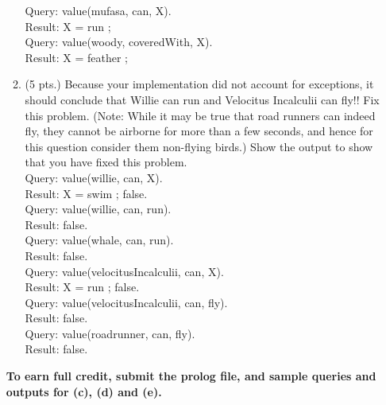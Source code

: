 \documentclass{article}%
\begin{document}
\begin{enumerate}
\begin{enumerate}
		Query: value(mufasa, can, X).\\
		Result: X = run ;\\
		
		Query: value(woody, coveredWith, X).\\
		Result: X = feather ;\\
		
		
		
		\item (5 pts.) Because your implementation did not account for exceptions, it should conclude that Willie can run and Velocitus Incalculii can fly!! Fix this problem. (Note: While it may be true that road runners can indeed fly, they cannot be airborne for more than a few seconds, and hence for this question consider them non-flying birds.) Show the output to show that you have fixed this problem. \\
		
		Query: value(willie, can, X). \\
		Result: X = swim ; false. \\
		
		Query: value(willie, can, run). \\
		Result: false. \\
		 
		Query: value(whale, can, run). \\
		Result: false. \\
		
		Query: value(velocitusIncalculii, can, X). \\
		Result: X = run ; false. \\
		
		Query: value(velocitusIncalculii, can, fly). \\
		Result: false. \\
		
		Query: value(roadrunner, can, fly). \\
		Result: false. \\
		
		
\end{enumerate}

\textbf{To earn full credit, submit the prolog file, and sample queries and outputs for (c), (d) and (e).}


\end{enumerate}
\end{document}
